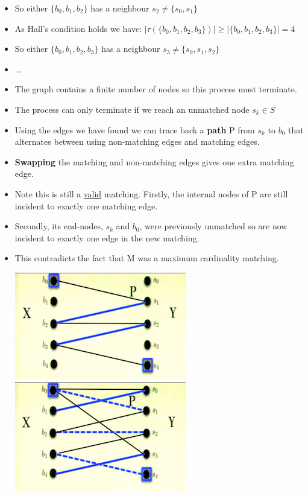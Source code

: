 \documentclass[12pt]{article}
\begin{document}
\begin{itemize}
\begin{itemize}
	\item So either $\{b_0, b_1, b_2\}$ has a neighbour $s_2  \neq \{s_0, s_1\}$
	\item As Hall's condition holds we have: $|\tau(\{b_0, b_1, b_2, b_3\})| \geq |\{b_0, b_1, b_2, b_3\}| = 4$
	\item So either $\{b_0, b_1, b_2, b_3\}$ has a neighbour $s_3  \neq \{s_0, s_1, s_2\}$\
	\item ...
	\item The graph contains a finite number of nodes so this process must terminate.
	\item The process can only terminate if we reach an unmatched node  $s_k \in S$
	\item Using the edges we have found we can trace back a \textbf{path} P from $s_k$ to $b_0$ that alternates between using non-matching edges and matching edges.
	\item \textbf{Swapping} the matching and non-matching edges gives one extra matching edge.
	\item Note this is still a \underline{valid} matching. Firstly, the internal nodes of P are still incident to exactly one matching edge.
	\item Secondly, its end-nodes, $s_k$ and $b_0$, were previously unmatched so are now incident to exactly one edge in the new matching.
	\item This contradicts the fact that M was a maximum cardinality matching.
	\begin{center}
	\includegraphics{lecture723}
	\includegraphics{lecture724}
	\end{center}
	\end{itemize} 
\end{itemize}
\end{document}
